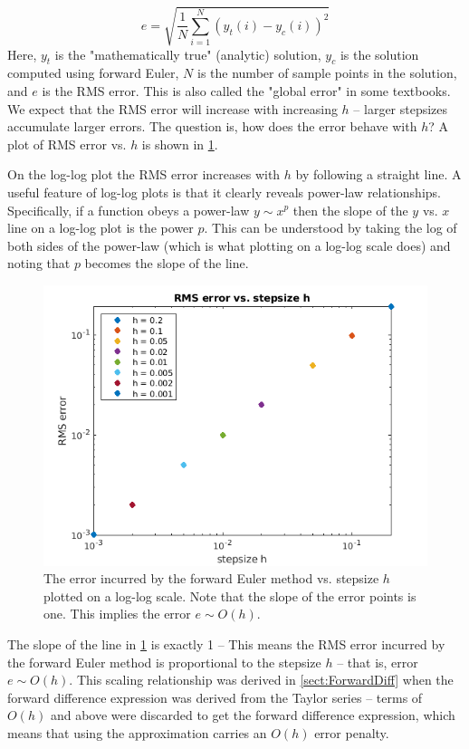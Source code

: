 \documentclass[hidelinks,notitlepage]{book}
\begin{document}
\begin{equation}
\label{eq:RMSErr}
e = \sqrt{\frac{1}{N} \sum_{i=1}^{N} \left( y_t(i) - y_c(i) \right)^2 }
\end{equation}
Here, $y_t$ is the "mathematically true" (analytic) solution, $y_c$ is the solution computed using forward Euler, $N$ is the number of sample points in the solution, and $e$ is the RMS error.  This is also called the "global error" in some textbooks.  We expect that the RMS error will increase with increasing $h$ -- larger stepsizes accumulate larger errors.  The question is, how does the error behave with $h$?  A plot of RMS error vs. $h$ is shown in \cref{fig:ForwardEulerExponentialErr}.  

On the log-log plot the RMS error increases with $h$ by following a straight line.  A useful feature of log-log plots is that it clearly reveals power-law relationships.  Specifically, if a function obeys a power-law $y \sim x^p$ then the slope of the $y$ vs. $x$ line on a log-log plot is the power $p$.  This can be understood by taking the log of both sides of the power-law (which is what plotting on a log-log scale does) and noting that $p$ becomes the slope of the line.
\begin{figure}[tbh]
	\centering
	\includegraphics[width=0.7\columnwidth]{ForwardEulerExponentialErr.png}
	\caption{The error incurred by the forward Euler method vs. stepsize $h$ plotted on a log-log scale.  Note that the slope of the error points is one.  This implies the error $e \sim O(h)$.}
	\label{fig:ForwardEulerExponentialErr}
\end{figure}
The slope of the line in \cref{fig:ForwardEulerExponentialErr} is exactly 1 -- This means the RMS error incurred by the forward Euler method is proportional to the stepsize $h$ -- that is, error $e \sim O(h)$.   This scaling relationship was derived in \cref{sect:ForwardDiff} when the forward difference expression was derived from the Taylor series -- terms of $O(h)$ and above were discarded to get the forward difference expression, which means that using the approximation carries an $O(h)$ error penalty.
\end{document}
